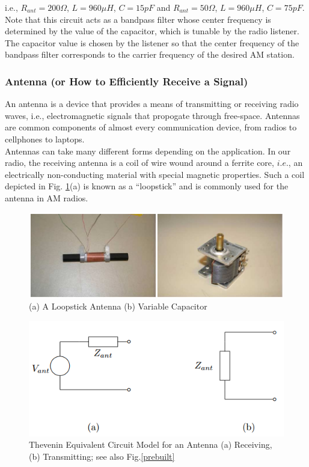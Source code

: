 \documentclass{article}
\begin{document}
i.e., $R_{ant} = 200 \Omega$, $L = 960 \mu H$, $C = 15 pF$ and $R_{ant} = 50 \Omega$, $L = 960 \mu H$, $C = 75 pF$. Note that this circuit acts as a bandpass filter whose center frequency is determined by the value of the capacitor, which is tunable by the radio listener. The capacitor value is chosen by the listener so that the center frequency of the bandpass filter corresponds to the carrier frequency of the desired AM station.
\subsubsection{Antenna (or How to Efficiently Receive a Signal)}
An antenna is a device that provides a means of transmitting or receiving radio waves, i.e., electromagnetic signals that propogate through free-space. Antennas are common components of almost every communication device, from radios to cellphones to laptops.\\
Antennas can take many different forms depending on the application. In our radio, the receiving
antenna is a coil of wire wound around a ferrite core, $i.e.$, an electrically non-conducting material with special magnetic properties. Such a coil depicted in Fig. \ref{antenna}(a) is known as a “loopstick” and is commonly used for the antenna in AM radios.\\
\begin{figure}[htbp]
	\centering
	\includegraphics[width=0.7\linewidth]{fig4.png}
	\caption{(a) A Loopstick Antenna (b) Variable Capacitor}
	\label{antenna}
\end{figure}
\begin{figure}[htbp]
	\centering
	\includegraphics[width=0.7\linewidth]{fig5.png}
	\caption{Thevenin Equivalent Circuit Model for an Antenna (a) Receiving, (b) Transmitting; see also Fig.\ref{prebuilt}}
	\label{thevenin}
\end{figure}
\end{document}
